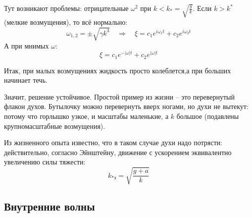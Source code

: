 Тут возникают проблемы: отрицательные $\omega^2$ при $k < k_* = \sqrt{\frac{g}{k}}$. Если $k>k^*$ (мелкие возмущения), то всё нормально:
\begin{equation}
    \omega_{1,2} = \pm\sqrt{\gamma k^3}
    \quad \Rightarrow \quad
    \xi = c_1e^{i\omega_1 t}+c_2e^{i\omega_2 t}
\end{equation}
А при мнимых $\omega$:
\begin{equation}
    \xi = c_1e^{-|\omega|t}+c_2e^{|\omega|t}
\end{equation}

Итак, при малых возмущениях жидкость просто колеблется,а при больших начинает течь.

Значит, решение устойчивое. Простой пример из жизни -- это перевернутый флакон духов. Бутылочку можно перевернуть вверх ногами, но духи не вытекут:
потому что горлышко узкое, и масштабы маленькие, а $k$ большое (подавлены крупномасштабные возмущения). 

Из жизненного опыта известно, что в таком случае духи надо потрясти: действительно, согласно Эйнштейну, движение с ускорением эквивалентно увеличению силы тяжести:
\begin{equation}
    k_{*\text{э}} = \sqrt{\frac{g+a}{k}}
\end{equation}

\newpage
\subsection{Внутренние волны}





